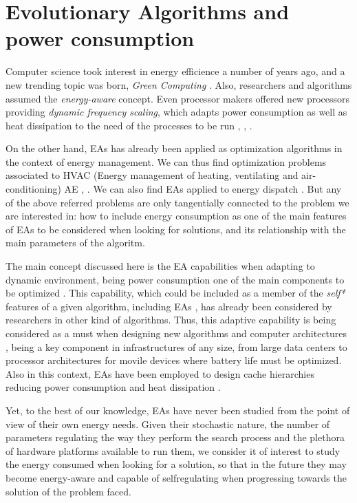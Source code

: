 \section{Evolutionary Algorithms and power consumption}
\label{eas}

Computer science took interest in energy efficience a number of years ago, and a new trending topic was born, \textit{Green Computing} \cite{green-computing}.  Also, researchers and algorithms assumed the \textit{energy-aware} \cite{energy-aware} concept.  Even processor makers offered new processors providing \textit{dynamic frequency scaling}, which adapts power consumption as well as heat dissipation to the need of the processes to be run \cite{scaling}, \cite{dynamic-scaling}, \cite{energy-efficient}.

On the other hand, EAs has already been applied as optimization algorithms in the context of energy management.  We can thus find optimization problems associated to HVAC (Energy management of heating, ventilating and air-conditioning) AE \cite{HVAC}, \cite{chiller}.  We can also find EAs applied to energy dispatch \cite{dispatch}.  But any of the above referred problems are only tangentially connected to the problem we are interested in:  how to include energy consumption as one of the main features of EAs to be considered when looking for solutions, and its relationship with the main parameters of the algoritm.

The main concept discussed here is the EA capabilities when adapting to dynamic environment, being power consumption one of the main components to be optimized \cite{ephemeral}. This capability, which could be included as a member of the \textit{self*} features of a given algorithm, including EAs \cite{self}, has already been considered by researchers in other kind of algorithms.  Thus, this adaptive capability is being considered as a must when designing new algorithms and computer architectures \cite{energy-aware}, being a key component in infrastructures of any size, from large data centers to processor architectures for movile devices where battery life must be optimized.  Also in this context, EAs have been employed to design cache hierarchies reducing power consumption and heat dissipation \cite{cache}.

Yet, to the best of our knowledge, EAs have never been studied from the point of view of their own energy needs.  %
Given their stochastic nature, the number of parameters regulating the way they perform the search process and the plethora of hardware platforms available to run them, we consider it of interest to study the energy consumed when looking for a solution, so that in the future they may become energy-aware and capable of selfregulating when progressing towards the solution of the problem faced.

